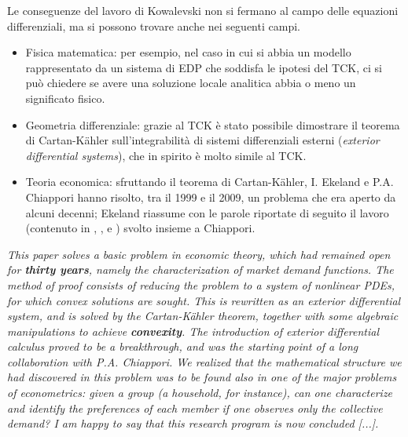 Le conseguenze del lavoro di Kowalevski non si fermano al campo delle equazioni differenziali, ma si possono trovare anche nei seguenti campi.

\begin{itemize}
\item Fisica matematica: per esempio, nel caso in cui si abbia un modello rappresentato da un sistema di EDP che soddisfa le ipotesi del TCK, ci si può chiedere se avere una soluzione locale analitica abbia o meno un significato fisico.
\item Geometria differenziale: grazie al TCK è stato possibile dimostrare il teorema di Cartan-Kähler sull'integrabilità di sistemi differenziali esterni (\textit{exterior differential systems}), che in spirito è molto simile al TCK.
\item Teoria economica: sfruttando il teorema di Cartan-Kähler, I. Ekeland e P.A. Chiappori hanno risolto, tra il 1999 e il 2009, un problema che era aperto da alcuni decenni; Ekeland riassume con le parole riportate di seguito il lavoro (contenuto in \cite{CE}, \cite{CEgenchar}, \cite{CEaggregation} e \cite{CEid}) svolto insieme a Chiappori.
\end{itemize}

\textit{This paper solves a basic problem in economic theory, which had remained open for \textbf{thirty years}, namely the characterization of market demand functions. The method of proof consists of reducing the problem to a system of nonlinear PDEs, for which convex solutions are sought. This is rewritten as an exterior differential system, and is solved by the Cartan-Kähler theorem, together with some algebraic manipulations to achieve \textbf{convexity}. The introduction of exterior differential calculus proved to be a breakthrough, and was the starting point of a long collaboration with P.A. Chiappori. We realized that the mathematical structure we had discovered in this problem was to be found also in one of the major problems of econometrics: given a group (a household, for instance), can one characterize and identify the preferences of each member if one observes only the collective demand? I am happy to say that this research program is now concluded [...].}

